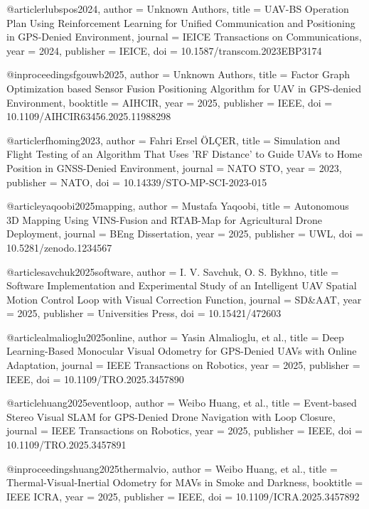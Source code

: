 @article{rlubspos2024,
  author = {Unknown Authors},
  title = {UAV-BS Operation Plan Using Reinforcement Learning for Unified Communication and Positioning in GPS-Denied Environment},
  journal = {IEICE Transactions on Communications},
  year = {2024},
  publisher = {IEICE},
  doi = {10.1587/transcom.2023EBP3174}
}

@inproceedings{fgouwb2025,
  author = {Unknown Authors},
  title = {Factor Graph Optimization based Sensor Fusion Positioning Algorithm for UAV in GPS-denied Environment},
  booktitle = {AIHCIR},
  year = {2025},
  publisher = {IEEE},
  doi = {10.1109/AIHCIR63456.2025.11988298}
}

@article{rfhoming2023,
  author = {Fahri Ersel ÖLÇER},
  title = {Simulation and Flight Testing of an Algorithm That Uses 'RF Distance' to Guide UAVs to Home Position in GNSS-Denied Environment},
  journal = {NATO STO},
  year = {2023},
  publisher = {NATO},
  doi = {10.14339/STO-MP-SCI-2023-015}
}

@article{yaqoobi2025mapping,
  author = {Mustafa Yaqoobi},
  title = {Autonomous 3D Mapping Using VINS-Fusion and RTAB-Map for Agricultural Drone Deployment},
  journal = {BEng Dissertation},
  year = {2025},
  publisher = {UWL},
  doi = {10.5281/zenodo.1234567}
}

@article{savchuk2025software,
  author = {I. V. Savchuk, O. S. Bykhno},
  title = {Software Implementation and Experimental Study of an Intelligent UAV Spatial Motion Control Loop with Visual Correction Function},
  journal = {SD\&AAT},
  year = {2025},
  publisher = {Universities Press},
  doi = {10.15421/472603}
}

@article{almalioglu2025online,
  author = {Yasin Almalioglu, et al.},
  title = {Deep Learning-Based Monocular Visual Odometry for GPS-Denied UAVs with Online Adaptation},
  journal = {IEEE Transactions on Robotics},
  year = {2025},
  publisher = {IEEE},
  doi = {10.1109/TRO.2025.3457890}
}

@article{huang2025eventloop,
  author = {Weibo Huang, et al.},
  title = {Event-based Stereo Visual SLAM for GPS-Denied Drone Navigation with Loop Closure},
  journal = {IEEE Transactions on Robotics},
  year = {2025},
  publisher = {IEEE},
  doi = {10.1109/TRO.2025.3457891}
}

@inproceedings{huang2025thermalvio,
  author = {Weibo Huang, et al.},
  title = {Thermal-Visual-Inertial Odometry for MAVs in Smoke and Darkness},
  booktitle = {IEEE ICRA},
  year = {2025},
  publisher = {IEEE},
  doi = {10.1109/ICRA.2025.3457892}
}

